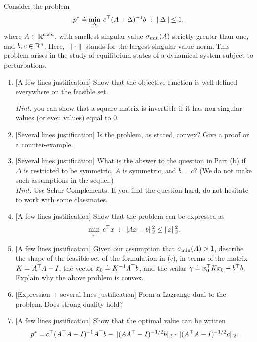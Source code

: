 \rm
\label{exer:duality_minmatpb}

Consider the problem
\[
p^* \doteq \min_{\Delta} \: c^{\top} (A+\Delta)^{-1}b ~:~ \|\Delta\| \le 1,
\]
where $A \in \mathbb{R}^{n\times n}$, with smallest singular value $\sigma_{\rm min}(A)$ strictly greater than one, and $b,c \in \mathbb{R}^{n}$. Here, $\|\cdot\|$ stands for the largest singular value norm. This problem arises in the study of equilibrium states of a dynamical system subject to perturbations.
\begin{enumerate}
	\item {[A few lines justification]}
	Show that the objective function is well-defined everywhere on the feasible set.
	
	\textit{Hint:} you can show that a square matrix is invertible if it has non singular values (or even values) equal to $0$.
	\sol{
	    
	}
	\item {[Several lines justification]}
	Is the problem, as stated, convex? Give a proof or a counter-example. 
	\sol{
	    
	}
	
	\item {[Several lines justification]} What is the abswer to the question in Part (b) if $\Delta$ is restricted to be symmetric, $A$ is symmetric, and $b=c$? (We do not make such assumptions in the sequel.)\\
	\textit{Hint:} Use Schur Complements. If you find the question hard, do not hesitate to work with some classmates.
	
	\sol{
	    
	}
	\item {[A few lines justification]}
	Show that the problem can be expressed as
	\[
	\min_x \: c^{\top} x ~:~ \|Ax-b\|_2^2 \le \|x\|_2^2.
	\]
	
	\sol{
	    
	}
	\item {[A few lines justification]}
	Given our assumption that $\sigma_{\rm min}(A)>1$, describe the shape of the feasible set of the formulation in (c), in terms of the matrix $K \doteq A^{\top} A - I$, the vector $x_0 \doteq K^{-1}A^{\top} b$, and the scalar $\gamma \doteq x_0^{\top} K x_0 - b^{\top} b$. Explain why the above problem is convex.
	
	\sol{
	    
	}

	\item {[Expression + several lines justification]}
	Form a Lagrange dual to the problem. Does strong duality hold?
	
	\sol{
	    
	}
	\item {[A few lines justification]}
	Show that the optimal value can be written
	\[
	p^* = c^{\top} (A^{\top} A - I)^{-1}A^{\top} b - \|(AA^{\top} - I)^{-1/2}b\|_2 \cdot \|(A^{\top} A - I)^{-1/2} c\|_2.
	\]
	
	\sol{
	    
	}

\end{enumerate}
